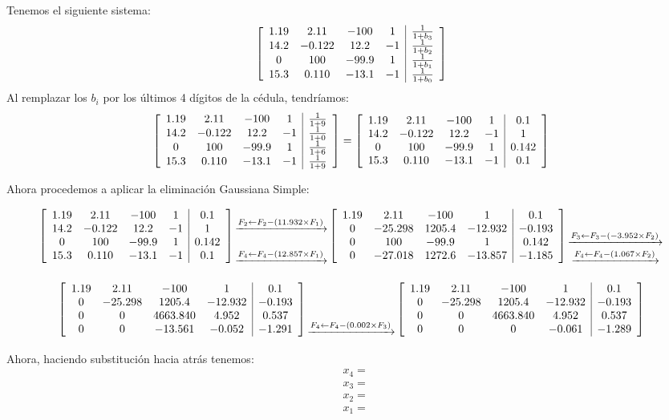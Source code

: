 
Tenemos el siguiente sistema:
\[
\left[ \begin{array}{cccc|c} 1.19 & 2.11 & -100 & 1 & \frac{1}{1+b_3} \\ 14.2 & -0.122 & 12.2 & -1 & \frac{1}{1+b_2} \\ 0 & 100 & -99.9 & 1 & \frac{1}{1+b_1} \\ 15.3 & 0.110 & -13.1 & -1 & \frac{1}{1+b_0} \end{array} \right]
\]
Al remplazar los $b_i$ por los últimos 4 dígitos de la cédula, tendríamos:
\[
\left[ \begin{array}{cccc|c} 1.19 & 2.11 & -100 & 1 & \frac{1}{1+9} \\ 14.2 & -0.122 & 12.2 & -1 & \frac{1}{1+0} \\ 0 & 100 & -99.9 & 1 & \frac{1}{1+6} \\ 15.3 & 0.110 & -13.1 & -1 & \frac{1}{1+9} \end{array} \right]
=
\left[ \begin{array}{cccc|c} 1.19 & 2.11 & -100 & 1 & 0.1 \\ 14.2 & -0.122 & 12.2 & -1 & 1 \\ 0 & 100 & -99.9 & 1 & 0.142 \\ 15.3 & 0.110 & -13.1 & -1 & 0.1 \end{array} \right]
\]

Ahora procedemos a aplicar la eliminación Gaussiana Simple:
\[
\customM{\doRow{1.19}{2.11}{-100}{1}{0.1}}
		{\doRow{14.2}{-0.122}{12.2}{-1}{1}}
		{\doRow{0}{100}{-99.9}{1}{0.142}}
		{\doRow{15.3}{0.110}{-13.1}{-1}{0.1}}
\arrows{}{\opEtres{2}{1}{11.932}}{}{\opEtres{4}{1}{12.857}}
\customM{\doRow{1.19}{2.11}{-100}{1}{0.1}}
		{\doRow{0}{-25.298}{1205.4}{-12.932}{-0.193}}
		{\doRow{0}{100}{-99.9}{1}{0.142}}
		{\doRow{0}{-27.018}{1272.6}{-13.857}{-1.185}}
\arrows{}{}{\opEtres{3}{2}{-3.952}}{\opEtres{4}{2}{1.067}}
\]

\[
\customM{\doRow{1.19}{2.11}{-100}{1}{0.1}}
		{\doRow{0}{-25.298}{1205.4}{-12.932}{-0.193}}
		{\doRow{0}{0}{4663.840}{4.952}{0.537}}
		{\doRow{0}{0}{-13.561}{-0.052}{-1.291}}
\arrows{}{}{}{\opEtres{4}{3}{0.002}}
\customM{\doRow{1.19}{2.11}{-100}{1}{0.1}}
		{\doRow{0}{-25.298}{1205.4}{-12.932}{-0.193}}
		{\doRow{0}{0}{4663.840}{4.952}{0.537}}
		{\doRow{0}{0}{0}{-0.061}{-1.289}}
\]



Ahora, haciendo substitución hacia atrás tenemos:
\begin{align*}
	& x_4 = \\
	& x_3 = \\
	& x_2 = \\
	& x_1 = 
\end{align*}